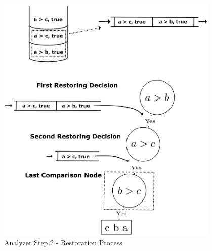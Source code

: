 \documentclass[final]{beamer}
\newlength{\onecolwid}
\newlength{\twocolwid}
\newlength{\onecolwidmid}
\begin{document}
\begin{frame}[t]
\begin{columns}[t]
\begin{column}{\twocolwid}
\begin{columns}[t,totalwidth=\twocolwid]
\begin{column}{\onecolwidmid}

\begin{figure}
\includegraphics[width=0.8\linewidth]{figures/bubble_sort_step_2_formatted.png}
\caption{Analyzer Step 2 - Restoration Process}
\label{analyzer:2}
\end{figure}


\end{column} %

\begin{column}{\onecolwidmid} %



\end{column}
\end{columns}
\end{column}
\end{columns}
\end{frame}
\end{document}
